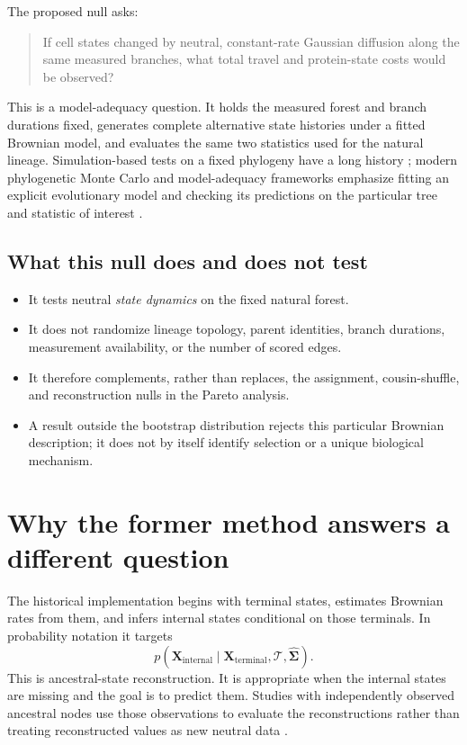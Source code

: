 \documentclass[10pt]{article}
\begin{document}
The proposed null asks:

\begin{quote}
If cell states changed by neutral, constant-rate Gaussian diffusion along the
same measured branches, what total travel and protein-state costs would be
observed?
\end{quote}

This is a model-adequacy question.  It holds the measured forest and branch
durations fixed, generates complete alternative state histories under a fitted
Brownian model, and evaluates the same two statistics used for the natural
lineage.  Simulation-based tests on a fixed phylogeny have a long history
\cite{garland1993}; modern phylogenetic Monte Carlo and model-adequacy
frameworks emphasize fitting an explicit evolutionary model and checking its
predictions on the particular tree and statistic of interest
\cite{boettiger2012,pennell2015}.

\subsection{What this null does and does not test}

\begin{itemize}
  \item It tests neutral \emph{state dynamics} on the fixed natural forest.
  \item It does not randomize lineage topology, parent identities, branch
        durations, measurement availability, or the number of scored edges.
  \item It therefore complements, rather than replaces, the assignment,
        cousin-shuffle, and reconstruction nulls in the Pareto analysis.
  \item A result outside the bootstrap distribution rejects this particular
        Brownian description; it does not by itself identify selection or a
        unique biological mechanism.
\end{itemize}

\section{Why the former method answers a different question}

The historical implementation begins with terminal states, estimates
Brownian rates from them, and infers internal states conditional on those
terminals.  In probability notation it targets
\[
 p\!\left(
   \mathbf{X}_{\mathrm{internal}}
   \mid \mathbf{X}_{\mathrm{terminal}},\mathcal{T},\widehat{\boldsymbol\Sigma}
 \right).
\]
This is ancestral-state reconstruction.  It is appropriate when the internal
states are missing and the goal is to predict them.  Studies with independently
observed ancestral nodes use those observations to evaluate the reconstructions
rather than treating reconstructed values as new neutral data
\cite{polly2001}.
\end{document}
